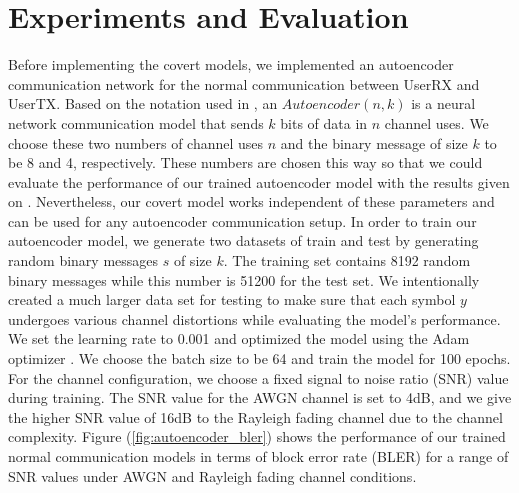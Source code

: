 \section{Experiments and Evaluation}
\label{s:eval}
Before implementing the covert models, we implemented an autoencoder communication network for the normal communication between UserRX and UserTX. Based on the notation used in \cite{o2017introduction}, an \(Autoencoder (n, k)\) is a neural network communication model that sends \(k\) bits of data in \(n\) channel uses. We choose these two numbers of channel uses \(n\) and the binary message of size \(k\) to be 8 and 4, respectively. These numbers are chosen this way so that we could evaluate the performance of our trained autoencoder model with the results given on \cite{o2017introduction}. Nevertheless, our covert model works independent of these parameters and can be used for any autoencoder communication setup. In order to train our autoencoder model, we generate two datasets of train and test by generating random binary messages \(s\) of size \(k\). The training set contains 8192 random binary messages while this number is 51200 for the test set. We intentionally created a much larger data set for testing to make sure that each symbol \(y\) undergoes various channel distortions while evaluating the model's performance. We set the learning rate to 0.001 and optimized the model using the Adam optimizer \cite{kingma2014adam}. We choose the batch size to be 64 and train the model for 100 epochs. For the channel configuration, we choose a fixed signal to noise ratio (SNR) value during training. The SNR value for the AWGN channel is set to 4dB, and we give the higher SNR value of 16dB to the Rayleigh fading channel due to the channel complexity. Figure (\ref{fig:autoencoder_bler}) shows the performance of our trained normal communication models in terms of block error rate (BLER) for a range of SNR values under AWGN and Rayleigh fading channel conditions.\\
